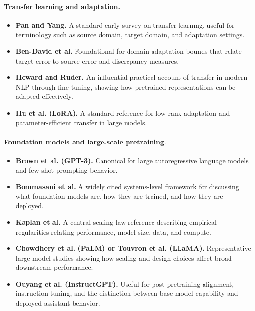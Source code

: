 \paragraph{Transfer learning and adaptation.}
\begin{itemize}
    \item \textbf{Pan and Yang.} A standard early survey on transfer learning, useful for terminology such as source domain, target domain, and adaptation settings.
    \item \textbf{Ben-David et al.} Foundational for domain-adaptation bounds that relate target error to source error and discrepancy measures.
    \item \textbf{Howard and Ruder.} An influential practical account of transfer in modern NLP through fine-tuning, showing how pretrained representations can be adapted effectively.
    \item \textbf{Hu et al. (LoRA).} A standard reference for low-rank adaptation and parameter-efficient transfer in large models.
\end{itemize}

\paragraph{Foundation models and large-scale pretraining.}
\begin{itemize}
    \item \textbf{Brown et al. (GPT-3).} Canonical for large autoregressive language models and few-shot prompting behavior.
    \item \textbf{Bommasani et al.} A widely cited systems-level framework for discussing what foundation models are, how they are trained, and how they are deployed.
    \item \textbf{Kaplan et al.} A central scaling-law reference describing empirical regularities relating performance, model size, data, and compute.
    \item \textbf{Chowdhery et al. (PaLM) or Touvron et al. (LLaMA).} Representative large-model studies showing how scaling and design choices affect broad downstream performance.
    \item \textbf{Ouyang et al. (InstructGPT).} Useful for post-pretraining alignment, instruction tuning, and the distinction between base-model capability and deployed assistant behavior.
\end{itemize}

